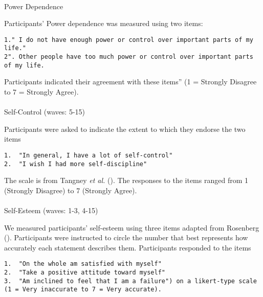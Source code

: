 \documentclass[
  singlecolumn,
  9pt]{article}
\makeatletter
\let\oldparagraph\paragraph
\renewcommand{\paragraph}{
    \@ifstar
      \xxxParagraphStar
      \xxxParagraphNoStar
  }
\newcommand{\xxxParagraphStar}[1]{\oldparagraph*{#1}\mbox{}}
\newcommand{\xxxParagraphNoStar}[1]{\oldparagraph{#1}\mbox{}}
\makeatother
\begin{document}
\paragraph{Power Dependence}\label{power-dependence}

Participants' Power dependence was measured using two items:

\begin{verbatim}
1." I do not have enough power or control over important parts of my life."
2". Other people have too much power or control over important parts of my life. 
\end{verbatim}

Participants indicated their agreement with these items'' (1 = Strongly
Disagree to 7 = Strongly Agree).

\paragraph{Self-Control (waves: 5-15)}\label{self-control-waves-5-15}

Participants were asked to indicate the extent to which they endorse the
two items

\begin{verbatim}
1.  "In general, I have a lot of self-control"
2.  "I wish I had more self-discipline"
\end{verbatim}

The scale is from Tangney \emph{et al.}
(). The responses to the items
ranged from 1 (Strongly Disagree) to 7 (Strongly Agree).

\paragraph{Self-Esteem (waves: 1-3,
4-15)}\label{self-esteem-waves-1-3-4-15}

We measured participants' self-esteem using three items adapted from
Rosenberg (). Participants were
instructed to circle the number that best represents how accurately each
statement describes them. Participants responded to the items

\begin{verbatim}
1.  "On the whole am satisfied with myself"
2.  "Take a positive attitude toward myself"
3.  "Am inclined to feel that I am a failure") on a likert-type scale (1 = Very inaccurate to 7 = Very accurate).
\end{verbatim}
\end{document}
